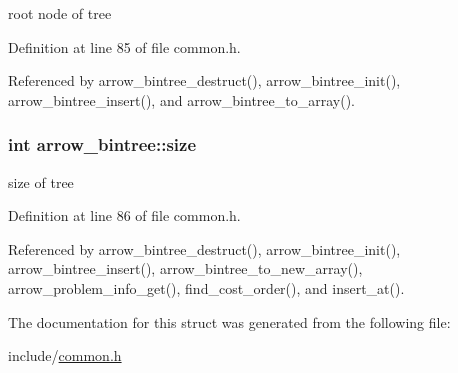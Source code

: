 root node of tree 

Definition at line 85 of file common.h.

Referenced by arrow\_\-bintree\_\-destruct(), arrow\_\-bintree\_\-init(), arrow\_\-bintree\_\-insert(), and arrow\_\-bintree\_\-to\_\-array().\hypertarget{structarrow__bintree_7570628df0b5317cc8e240499ba12974}{
\subsubsection[{size}]{\setlength{\rightskip}{0pt plus 5cm}int {\bf arrow\_\-bintree::size}}}
\label{structarrow__bintree_7570628df0b5317cc8e240499ba12974}


size of tree 

Definition at line 86 of file common.h.

Referenced by arrow\_\-bintree\_\-destruct(), arrow\_\-bintree\_\-init(), arrow\_\-bintree\_\-insert(), arrow\_\-bintree\_\-to\_\-new\_\-array(), arrow\_\-problem\_\-info\_\-get(), find\_\-cost\_\-order(), and insert\_\-at().

The documentation for this struct was generated from the following file:\begin{CompactItemize}
\item 
include/\hyperlink{common_8h}{common.h}\end{CompactItemize}
